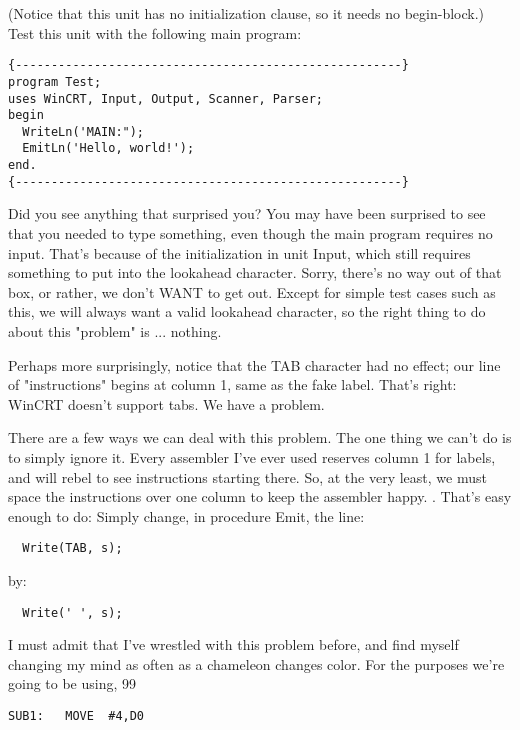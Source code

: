(Notice that this unit has no initialization clause, so it needs no begin-block.)
Test this unit with the following main program:

\begin{verbatim}
{------------------------------------------------------}
program Test;
uses WinCRT, Input, Output, Scanner, Parser;
begin
  WriteLn('MAIN:");
  EmitLn('Hello, world!');
end.
{------------------------------------------------------}
\end{verbatim}

Did you see anything that surprised you?  You may have been surprised to see that you needed to type something, even though the main program requires no input. That's because of the initialization in unit Input, which still requires something to put into the lookahead character. Sorry, there's no way out of that box, or rather, we don't  WANT  to get out. Except for simple test cases such as this, we will always want a valid lookahead character, so the right thing to do about this "problem" is ... nothing.

Perhaps more surprisingly, notice that the TAB character had no effect; our line of "instructions" begins at column 1, same as the fake label. That's right:  WinCRT doesn't support tabs. We have a problem.

There are a few ways we can deal with this problem. The one thing we can't do is to simply ignore it. Every assembler I've ever used reserves column 1 for labels, and will rebel to see instructions starting there. So, at the very least, we must space the instructions over one column to keep the assembler happy. . That's easy enough to do:  Simply change, in procedure Emit, the line:

\begin{verbatim}
  Write(TAB, s);
\end{verbatim}

by:

\begin{verbatim}
  Write(' ', s);
\end{verbatim}

I must admit that I've wrestled with this problem before, and find myself changing my mind as often as a chameleon changes color. For the purposes we're going to be using, 99%

\begin{verbatim}
SUB1:   MOVE  #4,D0
\end{verbatim}

